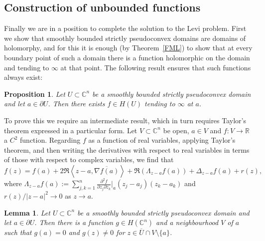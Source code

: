 \documentclass[11pt,a4paper, final, twoside]{article}
\newtheorem{lemma}[theorem]{Lemma}
\newtheorem{proposition}[theorem]{Proposition}
\numberwithin{equation}{section}
\newcommand{\C}{\mathbb C}
\newcommand{\R}{\mathbb R}
\newcommand{\con}[1]{\overline{#1}}
\newcommand{\clos}[1]{\overline{#1}}
\newcommand{\bd}{\partial}
\newcommand{\hol}{H}
\newcommand{\cts}{C}
\renewcommand{\sp}[2]{\left<#1,#2\right>}
\newcommand{\sprod}[2]{\sp{#1}{#2}}
\newcommand{\cgrad}[1]{\nabla #1}
\begin{document}
\subsection{Construction of unbounded functions}
Finally we are in a position to complete the solution to the Levi problem. First we show that
smoothly bounded strictly pseudoconvex domains are domains of holomorphy, and for this it is enough (by Theorem~\ref{FML}) to show that at every boundary point of such a domain
there is a function holomorphic on the domain and tending to $\infty$ at that point. The following result ensures that such functions always exist:
\begin{proposition}
\label{globalbarrier}
Let $U\subset\C^n$ be a smoothly bounded strictly pseudoconvex domain 
 and let $a\in\bd U$. Then there exists $f\in\hol(U)$ tending to $\infty$ at $a$.
\end{proposition}
To prove this we require an intermediate result, which in turn requires Taylor's theorem expressed in a particular form.
Let $V\subset\C^n$ be open, $a\in V$ and $f\colon V\to \R$ a $\cts^2$ function. Regarding $f$ as a function of real variables, applying Taylor's theorem, and then writing 
the derivatives with respect to real variables in terms of those with respect to complex variables, we find that
 \begin{equation}
  f(z)=f(a)+2\Re\sprod{z-a}{\con{\cgrad{f}(a)}}+\Re \left(\Lambda_{z-a} f(a)\right)+\Delta_{z-a} f(a)+r(z), \label{dfexp} \end{equation}
 where $\Lambda_{z-a} f(a):=\sum_{j,k=1}^n \frac{\partial^2f}{\partial z_j\partial z_k}\big|_a(z_j-a_j)(z_k-a_k)$ and $r(z)/|z-a|^2\to 0$ as $z\to a$.
\begin{lemma}
\label{spsunbdedloc}
Let $U\subset\C^n$ be a smoothly bounded strictly pseudoconvex domain and let $a\in\bd U$. Then there is a function $g\in\hol(\C^n)$ and a neighbourhood $V$ of $a$ such that
$g(a)=0$ and $g(z)\neq 0$ for $z\in\clos{U}\cap V\setminus\{a\}$.
\end{lemma}
\end{document}
